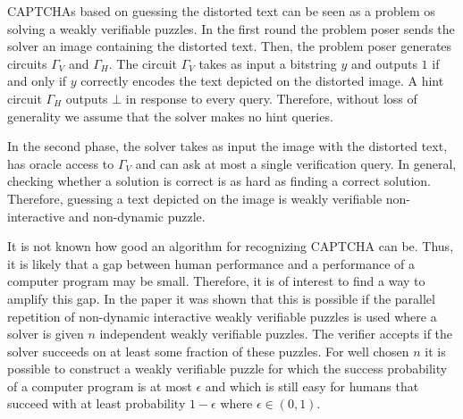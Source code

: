 CAPTCHAs based on guessing the distorted text can be seen as a problem os solving a weakly verifiable puzzles.
In the first round the problem poser sends the solver an image containing the distorted text.
Then, the problem poser generates circuits $\Gamma_V$ and $\Gamma_H$.
The circuit $\Gamma_V$ takes as input a bitstring $y$ and outputs $1$
if and only if $y$ correctly encodes the text depicted on the distorted image.
A hint circuit $\Gamma_H$ outputs $\bot$ in response to every query.
Therefore, without loss of generality we assume that the solver makes no hint queries.

In the second phase, the solver takes as input the image with the distorted text, has oracle access to $\Gamma_V$
and can ask at most a single verification query. In general, checking whether a solution is correct is
as hard as finding a correct solution.
Therefore, guessing a text depicted on the image is weakly verifiable non-interactive and non-dynamic puzzle.

It is not known how good an algorithm for recognizing CAPTCHA can be. Thus, it is likely that a gap between human
performance and a performance of a computer program may be small. Therefore, it is of interest to find a way to amplify this gap.
In the paper \cite{DBLP:journals/corr/abs-1002-3534} it was shown that this is possible if the parallel repetition of non-dynamic
interactive weakly verifiable puzzles is used where a solver is given $n$ independent weakly verifiable puzzles.
The verifier accepts if the solver succeeds on at least some fraction of these puzzles.
For well chosen $n$ it is possible to construct a weakly verifiable puzzle for which the success probability of a computer program is at most $\epsilon$ and
which is still easy for humans that succeed with at least probability $1 - \epsilon$ where $\epsilon \in (0,1)$.


